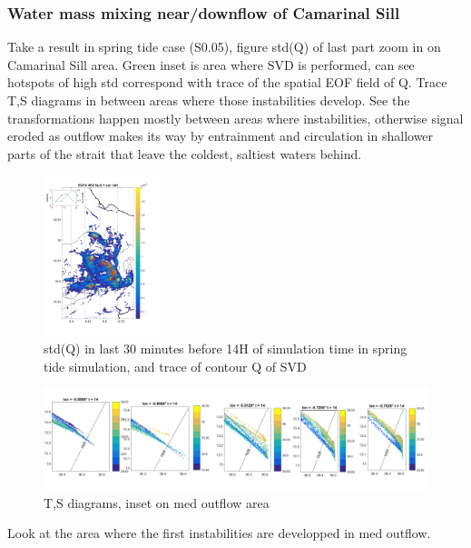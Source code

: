 
\subsubsection{Water mass mixing near/downflow of Camarinal Sill}

Take a result in spring tide case (S0.05), figure std(Q) of last part zoom in on Camarinal Sill area. Green inset is area where SVD is performed, can see hotspots of high std correspond with trace of the spatial EOF field of Q. Trace T,S diagrams in between areas where those instabilities develop. See the transformations happen mostly between areas where instabilities, otherwise signal eroded as outflow makes its way by entrainment and circulation in shallower parts of the strait that leave the coldest, saltiest waters behind.

\begin{figure}[!h]
 \includegraphics[width=0.3\textwidth]{./GBR3D/EOF_std_14hCso_traces.png}
 \caption {std(Q) in last 30 minutes before 14H of simulation time in spring tide simulation, and trace of contour Q of SVD}
\end{figure}

\begin{figure}[!h]
 \includegraphics[width=\textwidth]{./GBR3D/TS_coupesCso14h.png}
 \caption {T,S diagrams, inset on med outflow area}
\end{figure}

Look at the area where the first instabilities are developped in med outflow.

